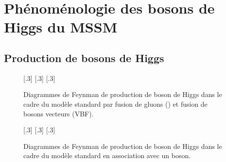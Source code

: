 \section{Phénoménologie des bosons de Higgs du MSSM}\label{chapter-MS-MSSM-section-pheno_Higgs_MSSM}
\subsection{Production de bosons de Higgs}\label{chapter-MS-MSSM-section-pheno_Higgs_MSSM-subsec-production}

\begin{figure}[h]
\centering
\vspace{\baselineskip}
[.3\textwidth]
{\vspace{\baselineskip}}
\hfill
{}[.3\textwidth]
{\vspace{\baselineskip}}
\hfill
{}[.3\textwidth]
{\vspace{\baselineskip}}
\caption{Diagrammes de Feynman de production de boson de Higgs dans le cadre du modèle standard par fusion de gluons (\gluon\gluon\higgs) et fusion de bosons vecteurs (VBF).}
\label{fig-fgraph-Higgs_prod_ggh_VBF}
\end{figure}

\begin{figure}[h]
\centering
\vspace{\baselineskip}
[.3\textwidth]
{\vspace{\baselineskip}}
\hfill
{}[.3\textwidth]
{\vspace{\baselineskip}}
\hfill
{}[.3\textwidth]
{\vspace{\baselineskip}}
\caption{Diagrammes de Feynman de production de boson de Higgs dans le cadre du modèle standard en association avec un boson.}
\label{fig-fgraph-Higgs_prod_VH_ggZh}
\end{figure}

